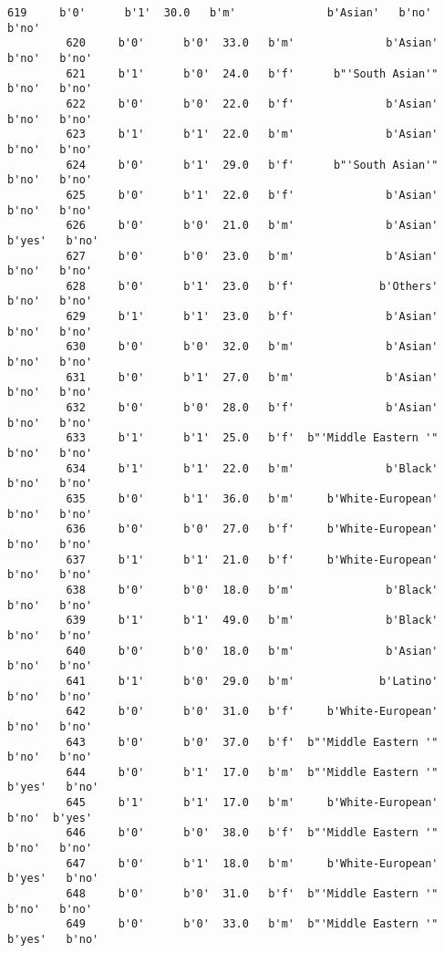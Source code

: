 \documentclass[11pt]{article}
\begin{document}
\begin{Verbatim}[commandchars=\\\{\}]
         619     b'0'      b'1'  30.0   b'm'              b'Asian'   b'no'   b'no'   
         620     b'0'      b'0'  33.0   b'm'              b'Asian'   b'no'   b'no'   
         621     b'1'      b'0'  24.0   b'f'      b"'South Asian'"   b'no'   b'no'   
         622     b'0'      b'0'  22.0   b'f'              b'Asian'   b'no'   b'no'   
         623     b'1'      b'1'  22.0   b'm'              b'Asian'   b'no'   b'no'   
         624     b'0'      b'1'  29.0   b'f'      b"'South Asian'"   b'no'   b'no'   
         625     b'0'      b'1'  22.0   b'f'              b'Asian'   b'no'   b'no'   
         626     b'0'      b'0'  21.0   b'm'              b'Asian'  b'yes'   b'no'   
         627     b'0'      b'0'  23.0   b'm'              b'Asian'   b'no'   b'no'   
         628     b'0'      b'1'  23.0   b'f'             b'Others'   b'no'   b'no'   
         629     b'1'      b'1'  23.0   b'f'              b'Asian'   b'no'   b'no'   
         630     b'0'      b'0'  32.0   b'm'              b'Asian'   b'no'   b'no'   
         631     b'0'      b'1'  27.0   b'm'              b'Asian'   b'no'   b'no'   
         632     b'0'      b'0'  28.0   b'f'              b'Asian'   b'no'   b'no'   
         633     b'1'      b'1'  25.0   b'f'  b"'Middle Eastern '"   b'no'   b'no'   
         634     b'1'      b'1'  22.0   b'm'              b'Black'   b'no'   b'no'   
         635     b'0'      b'1'  36.0   b'm'     b'White-European'   b'no'   b'no'   
         636     b'0'      b'0'  27.0   b'f'     b'White-European'   b'no'   b'no'   
         637     b'1'      b'1'  21.0   b'f'     b'White-European'   b'no'   b'no'   
         638     b'0'      b'0'  18.0   b'm'              b'Black'   b'no'   b'no'   
         639     b'1'      b'1'  49.0   b'm'              b'Black'   b'no'   b'no'   
         640     b'0'      b'0'  18.0   b'm'              b'Asian'   b'no'   b'no'   
         641     b'1'      b'0'  29.0   b'm'             b'Latino'   b'no'   b'no'   
         642     b'0'      b'0'  31.0   b'f'     b'White-European'   b'no'   b'no'   
         643     b'0'      b'0'  37.0   b'f'  b"'Middle Eastern '"   b'no'   b'no'   
         644     b'0'      b'1'  17.0   b'm'  b"'Middle Eastern '"  b'yes'   b'no'   
         645     b'1'      b'1'  17.0   b'm'     b'White-European'   b'no'  b'yes'   
         646     b'0'      b'0'  38.0   b'f'  b"'Middle Eastern '"   b'no'   b'no'   
         647     b'0'      b'1'  18.0   b'm'     b'White-European'  b'yes'   b'no'   
         648     b'0'      b'0'  31.0   b'f'  b"'Middle Eastern '"   b'no'   b'no'   
         649     b'0'      b'0'  33.0   b'm'  b"'Middle Eastern '"  b'yes'   b'no'   

\end{Verbatim}
\end{document}
